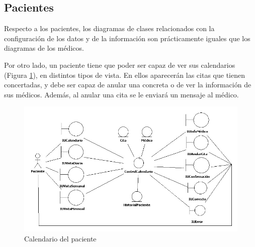 
\newpage
\subsection{Pacientes} %
\label{sub:pacientes}

Respecto a los pacientes, los diagramas de clases relacionados con la configuración de los datos y de la información son prácticamente iguales que los diagramas de los médicos.

Por otro lado, un paciente tiene que poder ser capaz de ver sus calendarios (Figura \ref{fig:col_clase11}), en distintos tipos de vista. En ellos aparecerán las citas que tienen concertadas, y debe ser capaz de anular una concreta o de ver la información de sus médicos. Además, al anular una cita se le enviará un mensaje al médico.
\begin{figure}[H]
  \centering
    \includegraphics[width=16cm]{img/jpg/clases/10_PacientesCalendario.jpg}
  \caption{Calendario del paciente}
  \label{fig:col_clase11}
\end{figure}


